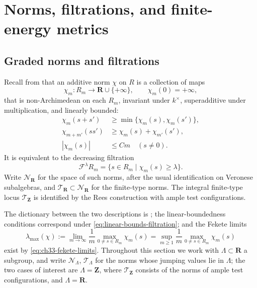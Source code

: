 \section{Norms, filtrations, and finite-energy metrics}
\label{sec:ch50-norms}

\subsection{Graded norms and filtrations}
\label{sec:ch50-norm-recall}

Recall from  that an additive norm
$\chi$ on $R$ is a collection of maps
\[
 \chi_m:R_m\longrightarrow\mathbf R\cup\{+\infty\},\qquad
 \chi_m(0)=+\infty,
\]
that is non-Archimedean on each $R_m$, invariant under
$k^\times$, superadditive under multiplication, and linearly bounded:
\[
 \begin{split}
 \chi_m(s+s')&\geq\min\{\chi_m(s),\chi_m(s')\},\\
 \chi_{m+m'}(ss')&\geq\chi_m(s)+\chi_{m'}(s'),\\
 |\chi_m(s)|&\leq Cm\quad(s\ne0).
 \end{split}
\tag{50.2}\label{eq:stability-norm-axioms}
\]
It is equivalent to the decreasing filtration
\[
             \mathcal F^\lambda R_m
             =\{s\in R_m\mid\chi_m(s)\geq\lambda\}.
\tag{50.3}\label{eq:stability-norm-filtration}
\]
Write $\mathcal N_{\mathbf R}$ for the space of such norms, after the
usual identification on Veronese subalgebras, and
$\mathcal T_{\mathbf R}\subset\mathcal N_{\mathbf R}$ for the finite-type
norms.  The integral finite-type locus
$\mathcal T_{\mathbf Z}$ is identified by the Rees construction with
ample test configurations.

The dictionary between the two descriptions is
; the linear-boundedness
conditions correspond under \eqref{eq:linear-bounds-filtration}; and the
Fekete limits
\[
 \lambda_{\max}(\chi):=\lim_{m\to\infty}\frac1m\max_{0\ne s\in R_m}\chi_m(s)
 =\sup_{m\ge1}\frac1m\max_{0\ne s\in R_m}\chi_m(s)
\tag{50.4}\label{eq:ch50-lambda-max}
\]
exist by \eqref{eq:ch33-fekete-limits}.  Throughout this section we work
with $\Lambda\subset\mathbf R$ a subgroup, and write
$\mathcal N_\Lambda$, $\mathcal T_\Lambda$ for the norms whose jumping
values lie in $\Lambda$; the two cases of interest are
$\Lambda=\mathbf Z$, where $\mathcal T_{\mathbf Z}$ consists of the
norms of ample test configurations, and $\Lambda=\mathbf R$.

